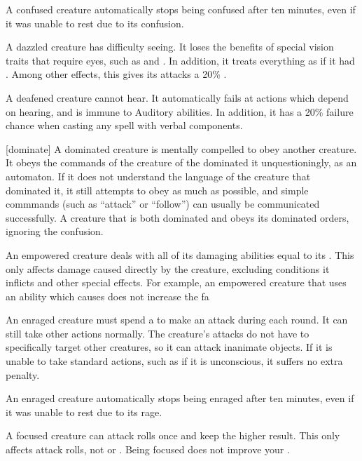   A confused creature automatically stops being confused after ten minutes, even if it was unable to rest due to its confusion.

   A dazzled creature has difficulty seeing.
  It loses the benefits of special vision traits that require eyes, such as  and .
  In addition, it treats everything as if it had .
  Among other effects, this gives its  attacks a 20\% .

   A deafened creature cannot hear.
  It automatically fails at actions which depend on hearing, and is immune to Auditory abilities.
  In addition, it has a 20\% failure chance when casting any spell with verbal components.

  [dominate] A dominated creature is mentally compelled to obey another creature.
  It obeys the commands of the creature of the dominated it unquestioningly, as an automaton.
  If it does not understand the language of the creature that dominated it, it still attempts to obey as much as possible, and simple commmands (such as ``attack'' or ``follow'') can usually be communicated successfully.
  A creature that is both dominated and \confused obeys its dominated orders, ignoring the confusion.

   An empowered creature deals  with all of its damaging abilities equal to its .
  This only affects damage caused directly by the creature, excluding conditions it inflicts and other special effects.
  For example, an empowered creature that uses an ability which causes  does not increase the fa

   An enraged creature must spend a  to make an attack during each round.
  It can still take other actions normally.
  The creature's attacks do not have to specifically target other creatures, so it can attack inanimate objects.
  If it is unable to take standard actions, such as if it is unconscious, it suffers no extra penalty.

  An enraged creature automatically stops being enraged after ten minutes, even if it was unable to rest due to its rage.

   A focused creature can  attack rolls once and keep the higher result.
  This only affects attack rolls, not  or .
  Being focused does not improve your .

